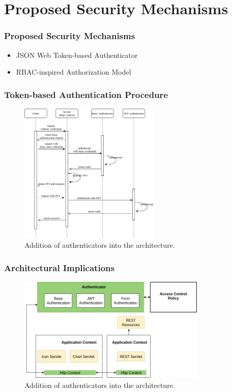 \documentclass{beamer}
\begin{document}
\section{Proposed Security Mechanisms}
\begin{frame}
\frametitle{Proposed Security Mechanisms}
\begin{itemize}
  \setlength\itemsep{1.5em}
\item JSON Web Token-based Authenticator
\item RBAC-inspired Authorization Model
\end{itemize}
\end{frame}
\begin{frame}
\frametitle{Token-based Authentication Procedure}
\begin{figure} [ht] 
\begin{center}
\includegraphics[width=0.6\textwidth]{esh_auth_sequence}
\caption{Addition of authenticators into the architecture.}
\label{fig:esh_arch_authenticator}
\end{center}
\end{figure}
\end{frame}
\begin{frame}
\frametitle{Architectural Implications}
\begin{figure} [ht] 
\begin{center}
\includegraphics[width=0.8\textwidth]{esh_arch_authenticator}
\caption{Addition of authenticators into the architecture.}
\label{fig:esh_arch_authenticator}
\end{center}
\end{figure}
\end{frame}
\end{document}
